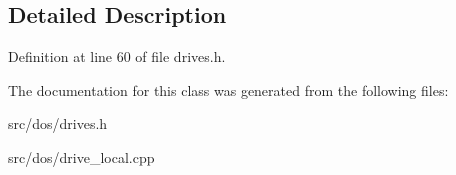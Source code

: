 \subsection{Detailed Description}


Definition at line 60 of file drives.\-h.



The documentation for this class was generated from the following files\-:\begin{DoxyCompactItemize}
\item 
src/dos/drives.\-h\item 
src/dos/drive\-\_\-local.\-cpp\end{DoxyCompactItemize}
